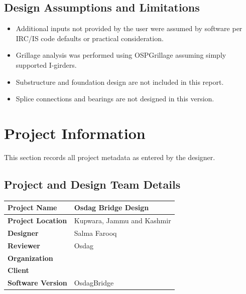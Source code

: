 \documentclass[12pt,a4paper]{report}
\numberwithin{table}{chapter}
\numberwithin{figure}{chapter}
\begin{document}
\section*{Design Assumptions and Limitations}
\label{sec:assumptions}

\begin{itemize}
\item Additional inputs not provided by the user were assumed by software per IRC/IS code defaults or practical consideration.
\item Grillage analysis was performed using OSPGrillage assuming simply supported I-girders.
\item Substructure and foundation design are not included in this report.
\item Splice connections and bearings are not designed in this version.
\end{itemize}

\titleformat{\chapter}[block]{\normalfont\Large\bfseries\centering}{\thechapter}{1em}{}
\titlespacing*{\chapter}{0pt}{-30pt}{10pt}


\chapter{Project Information}

This section records all project metadata as entered by the designer.

\section{Project and Design Team Details}
\label{sec:project-details}

\begin{tabular}{|L{5.5cm}|L{8.5cm}|}
\hline
\textbf{Project Name} & Osdag Bridge Design \\
\hline
\textbf{Project Location} & Kupwara, Jammu and Kashmir \\
\hline
\textbf{Designer} & Salma Farooq \\
\hline
\textbf{Reviewer} & Osdag \\
\hline
\textbf{Organization} &  \\
\hline
\textbf{Client} &  \\
\hline
\textbf{Software Version} & OsdagBridge \\
\hline
\end{tabular}
\end{document}
